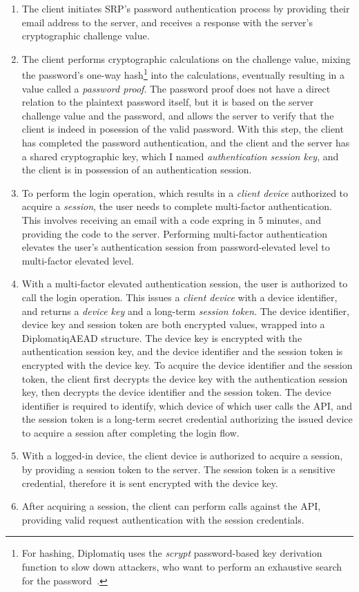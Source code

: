 \begin{enumerate}
\item The client initiates SRP's password authentication process by providing their email address to the server, and receives a response with the server's cryptographic challenge value.
\item The client performs cryptographic calculations on the challenge value, mixing the password's one-way hash\footnote{For hashing, Diplomatiq uses the \emph{scrypt} password-based key derivation function to slow down attackers, who want to perform an exhaustive search for the password~\cite{rfc7914}.} into the calculations, eventually resulting in a value called a \emph{password proof}. The password proof does not have a direct relation to the plaintext password itself, but it is based on the server challenge value and the password, and allows the server to verify that the client is indeed in posession of the valid password. With this step, the client has completed the password authentication, and the client and the server has a shared cryptographic key, which I named \emph{authentication session key}, and the client is in possession of an authentication session.
\item To perform the login operation, which results in a \emph{client device} authorized to acquire a \emph{session}, the user needs to complete multi-factor authentication. This involves receiving an email with a code expring in 5 minutes, and providing the code to the server. Performing multi-factor authentication elevates the user's authentication session from password-elevated level to multi-factor elevated level.
\item With a multi-factor elevated authentication session, the user is authorized to call the login operation. This issues a \emph{client device} with a device identifier, and returns a \emph{device key} and a long-term \emph{session token}. The device identifier, device key and session token are both encrypted values, wrapped into a DiplomatiqAEAD structure. The device key is encrypted with the authentication session key, and the device identifier and the session token is encrypted with the device key. To acquire the device identifier and the session token, the client first decrypts the device key with the authentication session key, then decrypts the device identifier and the session token. The device identifier is required to identify, which device of which user calls the API, and the session token is a long-term secret credential authorizing the issued device to acquire a session after completing the login flow.
\item With a logged-in device, the client device is authorized to acquire a session, by providing a session token to the server. The session token is a sensitive credential, therefore it is sent encrypted with the device key.
\item After acquiring a session, the client can perform calls against the API, providing valid request authentication with the session credentials.
\end{enumerate}

